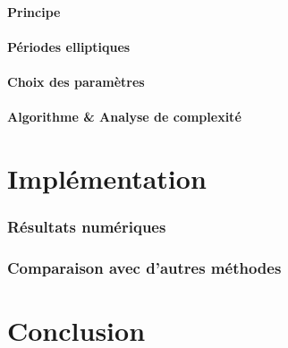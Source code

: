 \documentclass[a4paper]{article} %
\numberwithin{section}{part}
\numberwithin{equation}{section}
\begin{document}
\subsection{Principe}

\subsection{Périodes elliptiques}


\subsection{Choix des paramètres}

\subsection{Algorithme \& Analyse de complexité}

\part{Implémentation}
\section{Résultats numériques}

\section{Comparaison avec d'autres méthodes}

\part{Conclusion}
\end{document}
